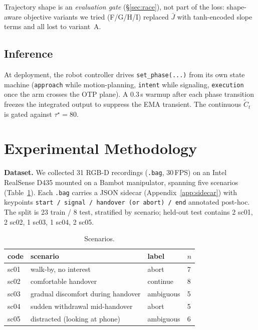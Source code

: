 \documentclass{article}
\newcommand{\code}[1]{\texttt{\small #1}}
\begin{document}
Trajectory shape is an \emph{evaluation gate} (\S\ref{sec:race}), not part of the loss: shape-aware objective variants we tried (F/G/H/I) replaced $\bar{J}$ with tanh-encoded slope terms and all lost to variant~A.

\subsection{Inference}

At deployment, the robot controller drives \code{set\_phase(...)} from its own state machine (\code{approach} while motion-planning, \code{intent} while signaling, \code{execution} once the arm crosses the OTP plane). A 0.3\,s warmup after each phase transition freezes the integrated output to suppress the EMA transient. The continuous $\tilde{C}_t$ is gated against $\tau^\star = 80$.

\section{Experimental Methodology}

\textbf{Dataset.} We collected 31 RGB-D recordings (\code{.bag}, 30\,FPS) on an Intel RealSense D435 mounted on a Bambot manipulator, spanning five scenarios (Table~\ref{tab:scen}). Each \code{.bag} carries a JSON sidecar (Appendix~\ref{app:sidecar}) with keypoints \code{start / signal / handover (or abort) / end} annotated post-hoc. The split is 23 train / 8 test, stratified by scenario; held-out test contains 2 sc01, 2 sc02, 1 sc03, 1 sc04, 2 sc05.

\begin{table}[h]
\centering
\caption{Scenarios.}
\label{tab:scen}
\small
\begin{tabular}{@{}llll@{}}
\toprule
code & scenario & label & $n$ \\
\midrule
sc01 & walk-by, no interest & abort & 7 \\
sc02 & comfortable handover & continue & 8 \\
sc03 & gradual discomfort during handover & ambiguous & 5 \\
sc04 & sudden withdrawal mid-handover & abort & 5 \\
sc05 & distracted (looking at phone) & ambiguous & 6 \\
\bottomrule
\end{tabular}
\end{table}
\end{document}
